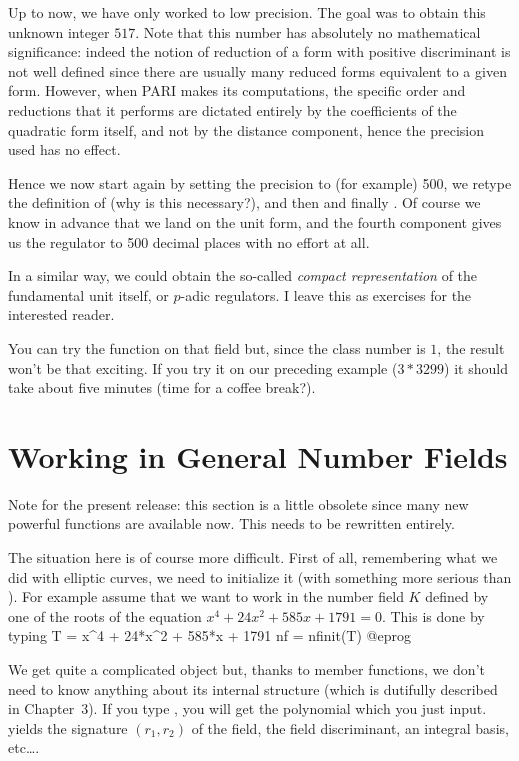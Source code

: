 Up to now, we have only worked to low precision. The goal was to obtain this
unknown integer $517$. Note that this number has absolutely no mathematical
significance: indeed the notion of reduction of a form with positive
discriminant is not well defined since there are usually many reduced forms
equivalent to a given form. However, when PARI makes its computations, the
specific order and reductions that it performs are dictated entirely by the
coefficients of the quadratic form itself, and not by the distance component,
hence the precision used has no effect.

Hence we now start again by setting the precision to (for example) 500,
we retype the definition of  (why is this necessary?), and then
 and finally . Of course we know in
advance that we land on the unit form, and the fourth component gives us the
regulator to 500 decimal places with no effort at all.

In a similar way, we could obtain the so-called \emph{compact representation}
of the fundamental unit itself, or $p$-adic regulators. I leave this as
exercises for the interested reader.

You can try the  function on that field but, since the class
number is $1$, the result won't be that exciting. If you try it on our
preceding example ($3*3299$) it should take about five minutes (time for a
coffee break?).

\section{Working in General Number Fields}

Note for the present release: this section is a little obsolete since many
new powerful functions are available now. This needs to be rewritten
entirely. \smallskip

The situation here is of course more difficult. First of all, remembering
what we did with elliptic curves, we need to initialize it (with something
more serious than ). For example assume that we want to work in
the number field $K$ defined by one of the roots of the equation
$x^4+24x^2+585x+1791=0$. This is done by typing
\bprog
T = x^4 + 24*x^2 + 585*x + 1791
nf = nfinit(T)
@eprog

We get quite a complicated object but, thanks to member functions, we don't
need to know anything about its internal structure (which is dutifully
described in Chapter~3). If you type , you will get the
polynomial  which you just input.  yields the signature
$(r_1,r_2)$ of the field,  the field discriminant, 
an integral basis, etc\dots.

